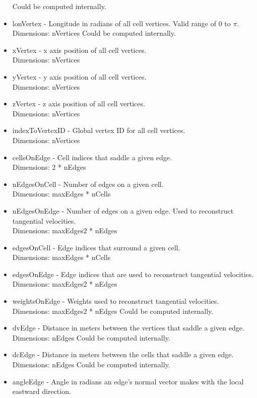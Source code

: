 \documentclass[11pt]{report}
\begin{document}
\begin{itemize}
		  Could be computed internally. 
	\item lonVertex - Longitude in radians of all cell vertices. Valid range of $0$ to $\pi$. \\
		  Dimensions: nVertices
		  Could be computed internally. 
	\item xVertex - x axis position of all cell vertices. \\
		  Dimensions: nVertices
	\item yVertex - y axis position of all cell vertices. \\
		  Dimensions: nVertices
	\item zVertex - z axis position of all cell vertices. \\
		  Dimensions: nVertices
	\item indexToVertexID - Global vertex ID for all cell vertices. \\
		  Dimensions: nVertices
	\item cellsOnEdge - Cell indices that saddle a given edge. \\
		  Dimensions: 2 * nEdges
	\item nEdgesOnCell - Number of edges on a given cell. \\
		  Dimensions: maxEdges * nCells
	\item nEdgesOnEdge - Number of edges on a given edge. Used to reconstruct tangential velocities. \\
		  Dimensions: maxEdges2 * nEdges
	\item edgesOnCell - Edge indices that surround a given cell. \\
		  Dimensions: maxEdges * nCells
	\item edgesOnEdge - Edge indices that are used to reconstruct tangential velocities. \\
		  Dimensions: maxEdges2 * nEdges
	\item weightsOnEdge - Weights used to reconstruct tangential velocities. \\
		  Dimensions: maxEdges2 * nEdges
		  Could be computed internally. 
	\item dvEdge - Distance in meters between the vertices that saddle a given edge. \\
		  Dimensions: nEdges
		  Could be computed internally. 
	\item dcEdge - Distance in meters between the cells that saddle a given edge. \\
		  Dimensions: nEdges
		  Could be computed internally. 
	\item angleEdge - Angle in radians an edge's normal vector makes with the local eastward direction. \\

\end{itemize}
\end{document}
